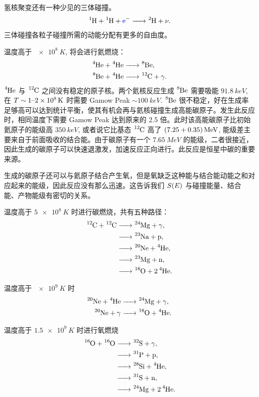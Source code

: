 \documentclass[../天体物理基础.tex]{subfiles}
\begin{document}
氢核聚变还有一种少见的三体碰撞。
\begin{equation}
\ce{^{1}H +^{1}H +{\color{blue}{\ce{e}}}^{-} ->^{2}H}+\nu.
\end{equation}
三体碰撞各粒子碰撞所需的动能分配有更多的自由度。

温度高于 $\qty{e8}{K}$, 将会进行氦燃烧：
\begin{align*}
\ce{^{4}He +^{4}He &->^{8}Be},\\
\ce{^{8}Be +^{4}He &->^{12}C}+\gamma.
\end{align*}
$\ce{^{4}He}$ 与 $\ce{^{12}C}$ 之间没有稳定的原子核。两个氦核反应生成 $\ce{^{8}Be}$ 需要吸能 $\qty{91.8}{keV}$, 在 $T\sim1\text{\textendash}\qty{2e8}{K}$ 时需要 Gamow Peak $\sim\qty{100}{keV}$. $\ce{^{8}Be}$ 很不稳定，好在生成率足够高可以达到统计平衡，使其有机会再与氦核碰撞生成高能碳原子。发生此反应时，相同温度下需要 Gamow Peak 达到原来的 2.5 倍。此时该高能碳原子比初始氦原子的能级高 $\qty{350}{keV}$, 或者说它比基态 $\ce{^{12}C}$ 高了 $\mleft(7.25+0.35\mright)\,\unit{MeV}$, 能级差主要来自于前面吸收的结合能。由于碳原子有一个 $\qty{7.65}{MeV}$ 的能级，二者很接近，因此生成的碳原子可以快速退激发，加速反应正向进行。此反应是恒星中碳的重要来源。

生成的碳原子还可以与氦原子结合产生氧，但是氧缺乏这种能与结合能动能之和对应起来的能级，因此反应没有那么迅速。这告诉我们 $S\mleft(E\mright)$ 与碰撞能量、结合能、产物能级有密切的关系。

温度高于 $\qty{5e8}{K}$ 时进行碳燃烧，共有五种路径：
\begin{align}
\ce{^{12}C +^{12}C &->^{24}Mg}+\gamma,\notag\\
\ce{&->^{23}Na +p},\notag\\
\ce{&->^{20}Ne +^{4}He},\notag\\
\ce{&->^{23}Mg +n},\notag\\
\ce{&->^{16}O +2^{4}He}.\notag
\end{align}

温度高于 $\qty{e9}{K}$ 时
\begin{align}
\ce{^{20}Ne +^{4}He &->^{24}Mg}+\gamma,\notag\\
\ce{^{20}Ne}+\gamma\ce{&->^{16}O +^{4}He}.\notag
\end{align}

温度高于 $\qty{1.5e9}{K}$ 时进行氧燃烧
\begin{align}
\ce{^{16}O +^{16}O &->^{32}S}+\gamma,\notag\\
\ce{&->^{31}P +p},\notag\\
\ce{&->^{28}Si +^{4}He},\notag\\
\ce{&->^{31}S +n},\notag\\
\ce{&->^{24}Mg +2^{4}He}.\notag
\end{align}
\end{document}
